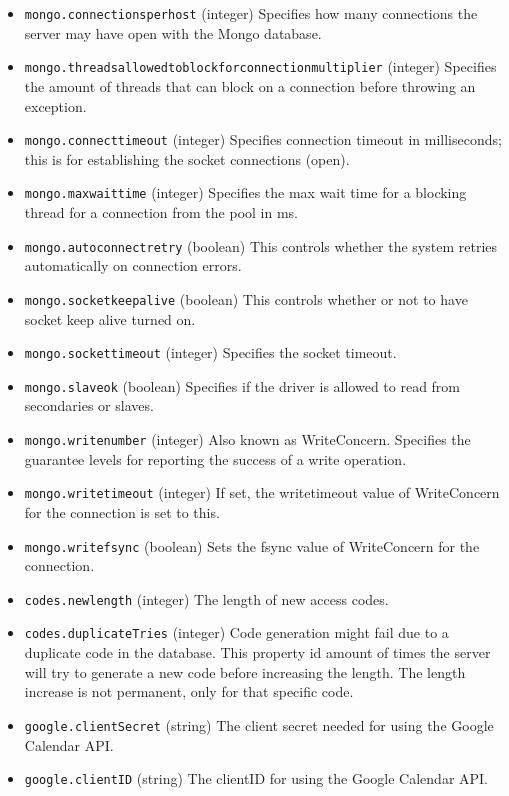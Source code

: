\begin{itemize}
\item \verb!mongo.connectionsperhost! (integer) Specifies how many connections the server may have open with the Mongo database.
\item \verb!mongo.threadsallowedtoblockforconnectionmultiplier! (integer) Specifies the amount of threads that can block on a connection before throwing an exception.
\item \verb!mongo.connecttimeout! (integer) Specifies connection timeout in milliseconds; this is for establishing the socket connections (open).
\item \verb!mongo.maxwaittime! (integer) Specifies the max wait time for a blocking thread for a connection from the pool in ms.
\item \verb!mongo.autoconnectretry! (boolean) This controls whether the system retries automatically on connection errors.
\item \verb!mongo.socketkeepalive! (boolean) This controls whether or not to have socket keep alive turned on.
\item \verb!mongo.sockettimeout! (integer) Specifies the socket timeout.
\item \verb!mongo.slaveok! (boolean) Specifies if the driver is allowed to read from secondaries or slaves.
\item \verb!mongo.writenumber! (integer) Also known as WriteConcern. Specifies the guarantee levels for reporting the success of a write operation.
\item \verb!mongo.writetimeout! (integer) If set, the writetimeout value of WriteConcern for the connection is set to this.
\item \verb!mongo.writefsync! (boolean) Sets the fsync value of WriteConcern for the connection.

\item \verb!codes.newlength! (integer) The length of new access codes.
\item \verb!codes.duplicateTries! (integer) Code generation might fail due to a duplicate code in the database. This property id amount of times the server will try to generate a new code before increasing the length. The length increase is not permanent, only for that specific code.

\item \verb!google.clientSecret! (string) The client secret needed for using the Google Calendar API.
\item \verb!google.clientID! (string) The clientID for using the Google Calendar API.


\end{itemize}
